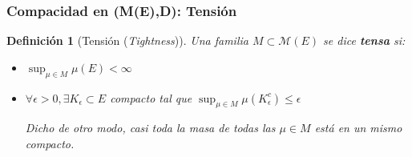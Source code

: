 \documentclass[letterpaper,11pt]{article} %
\theoremstyle{defbreak}
\newtheorem{definition}{Definición}[subsection]
\theoremstyle{propbreak}
\theoremstyle{remark}
\theoremstyle{break}
\begin{document}
\subsubsection{Compacidad en (M(E),D): Tensión}
\begin{definition}[Tensión (\textit{Tightness})]
\label{def:tension}
Una familia $M\subset\mathcal{M}(E)$ se dice \textbf{tensa} si:
\begin{itemize}
    \item[(i)] $\displaystyle\sup_{\mu\in M}\mu(E)<\infty$
    \item[(ii)] $\forall \epsilon >0, \exists K_\epsilon\subset E$ compacto tal que $\displaystyle\sup_{\mu\in M}\mu(K_\epsilon^c)\leq \epsilon$
    
Dicho de otro modo, casi toda la masa de todas las $\mu\in M$ está en un mismo compacto.
\end{itemize}
\end{definition}
\end{document}
